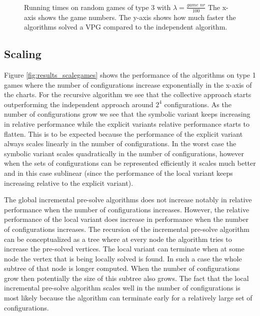 \begin{figure}[H]
	\centering
	\begin{multicols}{2}
		\\\vfill
		\\
		\\\vfill
		
	\end{multicols}
	\caption{Running times on random games of type 3 with $\lambda = \frac{\textit{game nr}}{100}$ The x-axis shows the game numbers. The y-axis shows how much faster the algorithms solved a VPG compared to the independent algorithm.}
	\label{fig:results_type3}
\end{figure}%

\subsection{Scaling}
Figure \ref{fig:results_scalegames} shows the performance of the algorithms on type 1 games where the number of configurations increase exponentially in the x-axis of the charts. For the recursive algorithm we see that the collective approach starts outperforming the independent approach around $2^4$ configurations. As the number of configurations grow we see that the symbolic variant keeps increasing in relative performance while the explicit variants relative performance starts to flatten. This is to be expected because the performance of the explicit variant always scales linearly in the number of configurations. In the worst case the symbolic variant scales quadratically in the number of configurations, however when the sets of configurations can be represented efficiently it scales much better and in this case sublinear (since the performance of the local variant keeps increasing relative to the explicit variant).

The global incremental pre-solve algorithms does not increase notably in relative performance when the number of configurations increases. However, the relative performance of the local variant does increase in performance when the number of configurations increases. The recursion of the incremental pre-solve algorithm can be conceptualized as a tree where at every node the algorithm tries to increase the pre-solved vertices. The local variant can terminate when at some node the vertex that is being locally solved is found. In such a case the whole subtree of that node is longer computed. When the number of configurations grow then potentially the size of this subtree also grows. The fact that the local incremental pre-solve algorithm scales well in the number of configurations is most likely because the algorithm can terminate early for a relatively large set of configurations.

